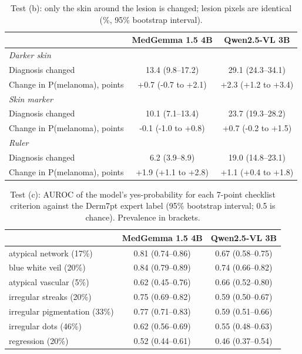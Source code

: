 \begin{table}[H]\centering\small
\caption{Test (b): only the skin around the lesion is changed; lesion pixels are identical (\%, 95\% bootstrap interval).}\label{tab:background}
\begin{tabular}{lcc}\toprule
 & MedGemma 1.5 4B & Qwen2.5-VL 3B \\\midrule
\textit{Darker skin} &  &  \\
\quad Diagnosis changed & 13.4 (9.8--17.2) & 29.1 (24.3--34.1) \\
\quad Change in P(melanoma), points & +0.7 (-0.7 to +2.1) & +2.3 (+1.2 to +3.4) \\
\textit{Skin marker} &  &  \\
\quad Diagnosis changed & 10.1 (7.1--13.4) & 23.7 (19.3--28.2) \\
\quad Change in P(melanoma), points & -0.1 (-1.0 to +0.8) & +0.7 (-0.2 to +1.5) \\
\textit{Ruler} &  &  \\
\quad Diagnosis changed & 6.2 (3.9--8.9) & 19.0 (14.8--23.1) \\
\quad Change in P(melanoma), points & +1.9 (+1.1 to +2.8) & +1.1 (+0.4 to +1.8) \\
\bottomrule\end{tabular}\end{table}

\begin{table}[H]\centering\small
\caption{Test (c): AUROC of the model's yes-probability for each 7-point checklist criterion against the Derm7pt expert label (95\% bootstrap interval; 0.5 is chance). Prevalence in brackets.}\label{tab:criteria}
\begin{tabular}{lcc}\toprule
 & MedGemma 1.5 4B & Qwen2.5-VL 3B \\\midrule
atypical network (17\%) & 0.81 (0.74--0.86) & 0.67 (0.58--0.75) \\
blue white veil (20\%) & 0.84 (0.79--0.89) & 0.74 (0.66--0.82) \\
atypical vascular (5\%) & 0.62 (0.45--0.76) & 0.66 (0.52--0.80) \\
irregular streaks (20\%) & 0.75 (0.69--0.82) & 0.59 (0.50--0.67) \\
irregular pigmentation (33\%) & 0.77 (0.71--0.83) & 0.59 (0.51--0.66) \\
irregular dots (46\%) & 0.62 (0.56--0.69) & 0.55 (0.48--0.63) \\
regression (20\%) & 0.52 (0.44--0.61) & 0.46 (0.37--0.54) \\
\bottomrule\end{tabular}\end{table}

